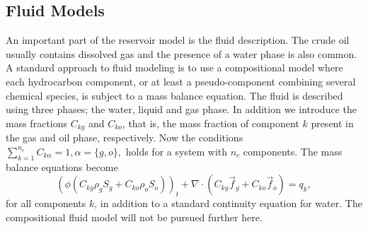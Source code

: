 \subsection{Fluid Models}
\label{section:fluid_models}
An important part of the reservoir model is the fluid description. The crude oil usually contains dissolved gas and the presence of a water phase is also common. A standard approach to fluid modeling is to use a compositional model where each hydrocarbon component, or at least a pseudo-component combining several chemical species, is subject to a mass balance equation. The fluid is described using three phases; the water, liquid and gas phase. In addition we introduce the mass fractions $C_{kg}$ and $C_{ko}$, that is, the mass fraction of component $k$ present in the gas and oil phase, respectively. Now the conditions $\sum_{k=1}^{n_c} C_{k \alpha} = 1, \alpha = \{g,o\},$ holds for a system with $n_c$ components. The mass balance equations become
\begin{equation*}
( \phi (C_{kg} \rho_g S_g + C_{ko} \rho_o S_o) )_t + \nabla \cdot (C_{kg} \vec{f}_g + C_{ko} \vec{f}_o) = q_k,
\end{equation*}
for all components $k$, in addition to a standard continuity equation for water. The compositional fluid model will not be pursued further here.

